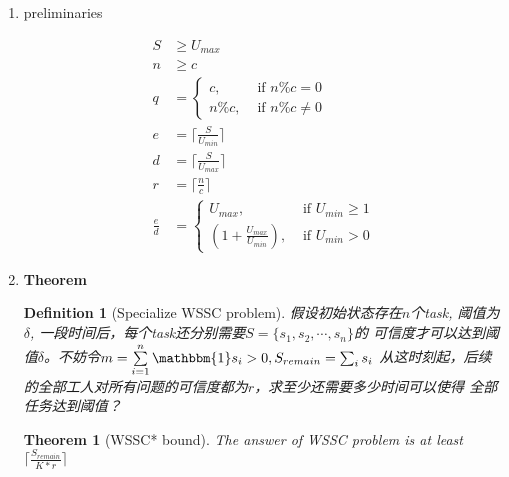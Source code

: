 \documentclass[UTF8]{ctexart}
\newcommand{\Emph}{\textbf}
\newtheorem{definition}{Definition} %
\newtheorem{theorem}{Theorem} %
\begin{document}
\newpage
\begin{enumerate}[(1)]
	
	\item preliminaries
	
	\begin{align*}
		S &\ge U_{max}					  \\
		n &\ge c						  \\
		q &= \left \{
				\begin{aligned}
					c,    &\text{ if } n\%c = 0 \\
					n\%c, &\text{ if } n\%c \neq 0
				\end{aligned}
			 \right . \\
		e &= \lceil \frac{S}{U_{min}} \rceil \\
		d &= \lceil \frac{S}{U_{max}} \rceil \\
		r &= \lceil \frac{n}{c}    \rceil \\
		\frac{e}{d} &= \left \{
						\begin{aligned}
							U_{max}, &\text{ if } U_{min} \ge 1 \\
							(1+\frac{U_{max}}{U_{min}}), &\text{ if } U_{min} > 0
						\end{aligned}
					\right .
	\end{align*}
	
	\newpage
	\item \Emph{Theorem}
	\begin{definition}[Specialize WSSC problem]
	假设初始状态存在$n$个task, 阈值为$\delta$, 一段时间后，每个task还分别需要$S = \{s_1, s_2, \cdots, s_n\}$的
	可信度才可以达到阈值$\delta$。不妨令$m = \sum\limits_{i=1}^{n} {\mathbbm{1} s_i>0}, S_{remain} = \sum_{i} {s_i}$
	从这时刻起，后续的全部工人对所有问题的可信度都为$r$，求至少还需要多少时间可以使得
	全部任务达到阈值？
	\end{definition}
	
	\begin{theorem}[WSSC* bound]
	\label{thm:optBound}
	The answer of WSSC problem is at least $\lceil \frac{S_{remain}}{K*r} \rceil$
	\end{theorem}
	

\end{enumerate}
\end{document}
